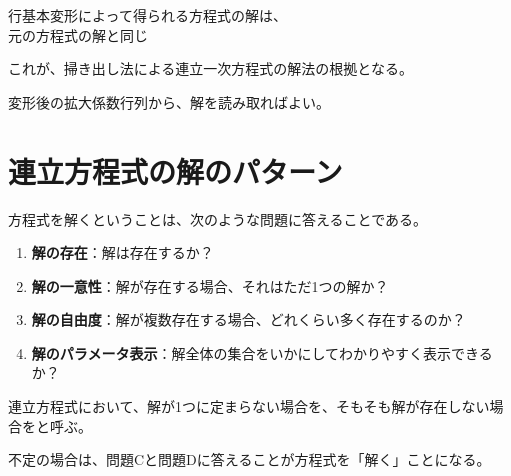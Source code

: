 \documentclass[../../../topic_linear-algebra]{subfiles}
\begin{document}
\begin{emphabox}
  \begin{spacebox}
    \begin{center}
      行基本変形によって得られる方程式の解は、\\
      元の方程式の解と同じ
    \end{center}
  \end{spacebox}
\end{emphabox}

これが、掃き出し法による連立一次方程式の解法の根拠となる。

変形後の拡大係数行列から、解を読み取ればよい。

\sectionline
\section{連立方程式の解のパターン}

方程式を解くということは、次のような問題に答えることである。

\begin{enumerate}[label=\Alph*.]
  \item {\bfseries 解の存在}：解は存在するか？
  \item {\bfseries 解の一意性}：解が存在する場合、それはただ1つの解か？
  \item {\bfseries 解の自由度}：解が複数存在する場合、どれくらい多く存在するのか？
  \item {\bfseries 解のパラメータ表示}：解全体の集合をいかにしてわかりやすく表示できるか？
\end{enumerate}

連立方程式において、解が1つに定まらない場合を、そもそも解が存在しない場合をと呼ぶ。

不定の場合は、問題Cと問題Dに答えることが方程式を「解く」ことになる。

\br
\end{document}
